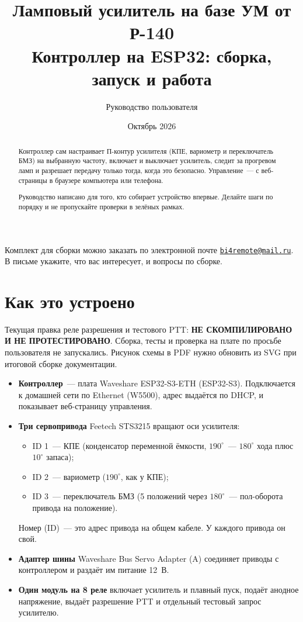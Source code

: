 \documentclass[a4paper,11pt]{article}
\title{\sffamily\bfseries Ламповый усилитель на базе УМ от Р-140\\[4pt]
\large Контроллер на ESP32: сборка, запуск и работа}
\author{Руководство пользователя}
\date{Октябрь 2026}
\makeatletter
\newcommand{\ordermail}{\href{mailto:bi4remote@mail.ru}{\texttt{bi4remote@mail.ru}}}
\makeatother
\begin{document}
\sloppy
\maketitle
\thispagestyle{empty}

\begin{abstract}
Контроллер сам настраивает П-контур усилителя (КПЕ, вариометр и переключатель БМЗ)
на выбранную частоту, включает и выключает усилитель, следит за прогревом ламп
и разрешает передачу только тогда, когда это безопасно. Управление~— с веб-страницы
в браузере компьютера или телефона.

Руководство написано для того, кто собирает устройство впервые. Делайте шаги
по порядку и не пропускайте проверки в зелёных рамках.
\end{abstract}

\begin{order}
Комплект для сборки можно заказать по электронной почте \ordermail.
В письме укажите, что вас интересует, и вопросы по сборке.
\end{order}

\tableofcontents
\newpage

\section{Как это устроено}

\begin{attention}
Текущая правка реле разрешения и тестового PTT: \textbf{НЕ СКОМПИЛИРОВАНО И НЕ ПРОТЕСТИРОВАНО}.
Сборка, тесты и проверка на плате по просьбе пользователя не запускались.
Рисунок схемы в PDF нужно обновить из SVG при итоговой сборке документации.
\end{attention}

\begin{itemize}
  \item \textbf{Контроллер}~— плата Waveshare ESP32-S3-ETH (ESP32-S3). Подключается к домашней сети
        по Ethernet (W5500), адрес выдаётся по DHCP, и показывает веб-страницу управления.
  \item \textbf{Три сервопривода} Feetech STS3215 вращают оси усилителя:
        \begin{itemize}
          \item ID 1~— КПЕ (конденсатор переменной ёмкости, $190^\circ$~— $180^\circ$ хода плюс $10^\circ$ запаса);
          \item ID 2~— вариометр ($190^\circ$, как у КПЕ);
          \item ID 3~— переключатель БМЗ (5 положений через $180^\circ$~— пол-оборота привода на положение).
        \end{itemize}
        Номер (ID)~— это адрес привода на общем кабеле. У каждого привода он свой.
  \item \textbf{Адаптер шины} Waveshare Bus Servo Adapter (A) соединяет приводы с контроллером
        и раздаёт им питание 12~В.
  \item \textbf{Один модуль на 8 реле} включает усилитель и плавный пуск, подаёт анодное напряжение,
        выдаёт разрешение PTT и отдельный тестовый запрос усилителю.
\end{itemize}
\end{document}
